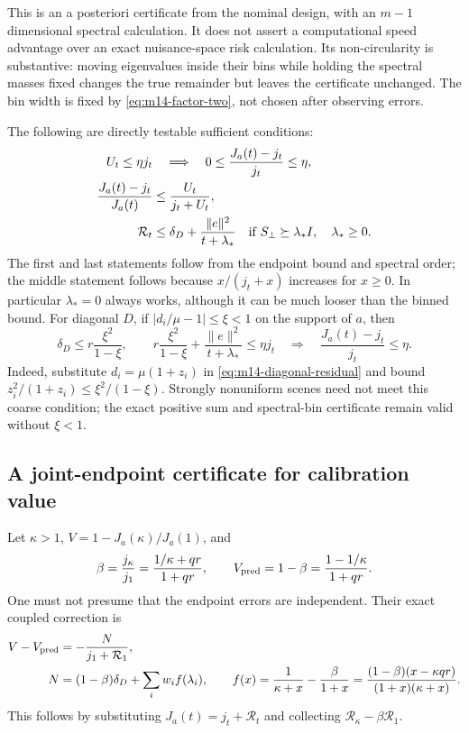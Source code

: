This is an a posteriori certificate from the nominal design, with an
$m-1$ dimensional spectral calculation.  It does not assert a computational
speed advantage over an exact nuisance-space risk calculation.  Its
non-circularity is substantive: moving eigenvalues inside their bins while
holding the spectral masses fixed changes the true remainder but leaves the
certificate unchanged.  The bin width is fixed by
\eqref{eq:m14-factor-two}, not chosen after observing errors.

The following are directly testable sufficient conditions:
\begin{align}
 U_t\leq\eta j_t&\quad\Longrightarrow\quad
      0\leq\frac{J_a(t)-j_t}{j_t}\leq\eta,\\
 \frac{J_a(t)-j_t}{J_a(t)}&\leq\frac{U_t}{j_t+U_t},\\
 \mathcal R_t&\leq\delta_D+\frac{\|e\|^2}{t+\lambda_*}
 \quad\hbox{if }S_\perp\succeq\lambda_*I,\quad\lambda_*\geq0.
 \label{eq:m14-sufficient}
\end{align}
The first and last statements follow from the endpoint bound and spectral
order; the middle statement follows because $x/(j_t+x)$ increases for
$x\geq0$.  In particular $\lambda_*=0$ always works, although it can be much
looser than the binned bound.  For diagonal $D$, if
$|d_i/\mu-1|\leq\xi<1$ on the support of $a$, then
\begin{equation}
 \delta_D\leq r\frac{\xi^2}{1-\xi},\qquad
 r\frac{\xi^2}{1-\xi}+\frac{\|e\|^2}{t+\lambda_*}\leq\eta j_t
 \quad\Longrightarrow\quad\frac{J_a(t)-j_t}{j_t}\leq\eta.
 \label{eq:m14-physical-sufficient}
\end{equation}
Indeed, substitute $d_i=\mu(1+z_i)$ in
\eqref{eq:m14-diagonal-residual} and bound
$z_i^2/(1+z_i)\leq\xi^2/(1-\xi)$.  Strongly nonuniform scenes need not meet
this coarse condition; the exact positive sum and spectral-bin certificate
remain valid without $\xi<1$.

\subsection{A joint-endpoint certificate for calibration value}
\label{subsec:m14-value}

Let $\kappa>1$, $V=1-J_a(\kappa)/J_a(1)$, and
\begin{equation}
 \beta=\frac{j_\kappa}{j_1}
       =\frac{1/\kappa+qr}{1+qr},\qquad
 V_{\rm pred}=1-\beta=\frac{1-1/\kappa}{1+qr}.
 \label{eq:m14-value-prediction}
\end{equation}
One must not presume that the endpoint errors are independent.  Their exact
coupled correction is
\begin{align}
 V-V_{\rm pred}&=-\frac{N}{j_1+\mathcal R_1},\\
 N&=(1-\beta)\delta_D+\sum_i w_i f(\lambda_i),\qquad
 f(x)=\frac1{\kappa+x}-\frac{\beta}{1+x}
     =\frac{(1-\beta)(x-\kappa qr)}{(1+x)(\kappa+x)}.
 \label{eq:m14-value-correction}
\end{align}
This follows by substituting $J_a(t)=j_t+\mathcal R_t$ and collecting
$\mathcal R_\kappa-\beta\mathcal R_1$.

